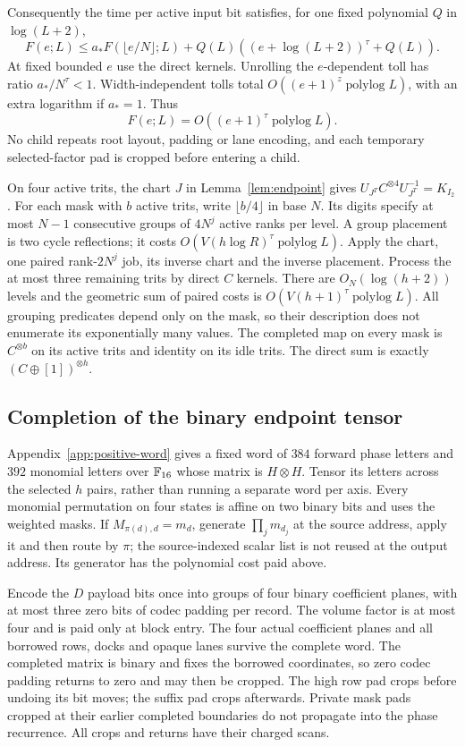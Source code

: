 Consequently the time per active input bit satisfies, for one fixed
polynomial $Q$ in $\log(L+2)$,
\[
 F(e;L)\le a_*F(\lfloor e/N\rfloor;L)
       +Q(L)((e+\log(L+2))^\tau+Q(L)).
\]
At fixed bounded $e$ use the direct kernels. Unrolling the $e$-dependent
toll has ratio $a_*/N^\tau<1$. Width-independent tolls total
$O((e+1)^z\operatorname{polylog}L)$, with an extra logarithm if
$a_*=1$. Thus
\[
 F(e;L)=O((e+1)^\tau\operatorname{polylog}L).
\]
No child repeats root layout, padding or lane encoding, and each
temporary selected-factor pad is cropped before entering a child.

On four active trits, the chart $J$ in Lemma~\ref{lem:endpoint}
gives
$U_{J^T}C^{\otimes4}U_{J^T}^{-1}=K_{I_2}$.
For each mask with $b$ active trits, write $\lfloor b/4\rfloor$ in
base $N$. Its digits specify at most $N-1$ consecutive groups of
$4N^j$ active ranks per level. A group placement is two cycle
reflections; it costs $O(V(h\log R)^\tau\operatorname{polylog}L)$.
Apply the chart, one paired rank-$2N^j$ job, its inverse chart and
the inverse placement. Process the at most three remaining trits
by direct $C$ kernels. There are $O_N(\log(h+2))$ levels and the
geometric sum of paired costs is $O(V(h+1)^\tau\operatorname{polylog}L)$.
All grouping predicates depend only on the mask, so their description
does not enumerate its exponentially many values. The completed map
on every mask is $C^{\otimes b}$ on its active trits and identity on
its idle trits. The direct sum is exactly $(C\oplus[1])^{\otimes h}$.

\subsection{Completion of the binary endpoint tensor}
Appendix~\ref{app:positive-word} gives a fixed word of $384$ forward
phase letters and $392$ monomial letters over $\mathbb F_{16}$ whose matrix
is $H\otimes H$. Tensor its letters across the selected $h$ pairs,
rather than running a separate word per axis. Every monomial
permutation on four states is affine on two binary bits and uses
the weighted masks. If $M_{\pi(d),d}=m_d$, generate
$\prod_jm_{d_j}$ at the source address, apply it and then route by
$\pi$; the source-indexed scalar list is not reused at the output
address. Its generator has the polynomial cost paid above.

Encode the $D$ payload bits once into groups of four binary coefficient
planes, with at most three zero bits of codec padding per record. The
volume factor is at most four and is paid only at block entry.
The four actual coefficient planes and all borrowed rows, docks and
opaque lanes survive the complete word. The completed matrix is
binary and fixes the borrowed coordinates, so zero codec padding
returns to zero and may then be cropped. The high row pad crops
before undoing its bit moves; the suffix pad crops afterwards.
Private mask pads cropped at their earlier completed boundaries do
not propagate into the phase recurrence. All crops and returns have
their charged scans.

